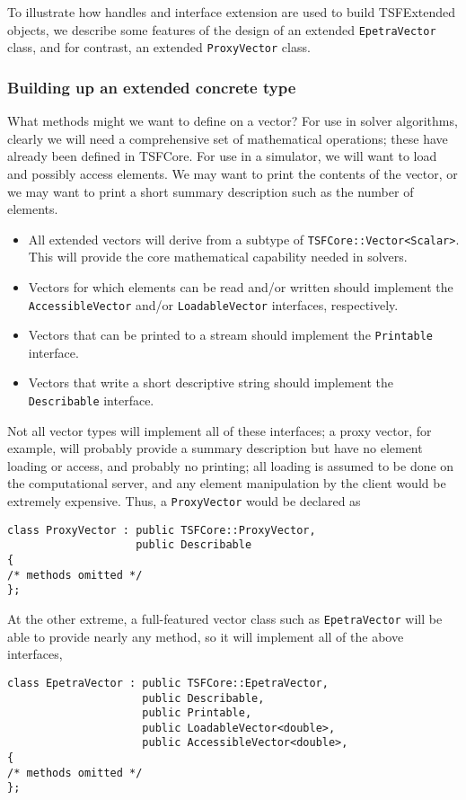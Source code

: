 To illustrate how handles and interface extension are used to
build TSFExtended objects,
we describe some features of the design of an extended {\tt EpetraVector} class, 
and for contrast, an extended {\tt ProxyVector} class. 

\subsubsection{Building up an extended concrete type}

What methods might we want to define on a vector? For use in solver
algorithms, clearly we will need
a comprehensive set of mathematical operations; these have already been
defined in TSFCore. For use in a simulator, we will want to load and
possibly access elements. We may want to print the contents of the vector,
or we may want to print a short summary description such as the number of
elements. 
\begin{itemize}
\item All extended vectors will derive from 
a subtype of {\tt TSFCore::Vector<Scalar>}. This will provide the core
mathematical capability needed in solvers.
\item Vectors for which elements can be read and/or written should implement
the {\tt AccessibleVector} and/or {\tt LoadableVector} interfaces, 
respectively.
\item Vectors that can be printed to a stream should implement the
{\tt Printable} interface.
\item Vectors that write a short descriptive string should
implement the {\tt Describable} interface.
\end{itemize}
Not all vector types will implement all of these interfaces; a 
proxy vector, for example, will probably provide a summary
description but have no element loading or access, 
and probably no printing; 
all loading is assumed to be done on the computational server, and any element
manipulation by the client would 
be extremely expensive. Thus, a {\tt ProxyVector} would be
declared as
\begin{verbatim}
class ProxyVector : public TSFCore::ProxyVector,
                    public Describable
{
/* methods omitted */
};
\end{verbatim}
At the other extreme, a full-featured
vector class such as {\tt EpetraVector} will be able to provide nearly
any method, so it will implement all of the above interfaces,
\begin{verbatim}
class EpetraVector : public TSFCore::EpetraVector,
                     public Describable,
                     public Printable,
                     public LoadableVector<double>,
                     public AccessibleVector<double>,
{
/* methods omitted */
};
\end{verbatim}

